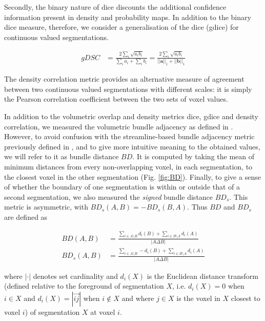Secondly, the binary nature of \gls{dice} discounts the additional confidence information present in density and probability maps.
In addition to the binary \gls{dice} measure, therefore, we consider a generalisation of the \gls{dice} (\gls{gdice}) for continuous valued segmentations.

\begin{align}
  gDSC &= \frac{2 \sum_i \sqrt{a_ib_i} }{\sum_ia_i + \sum_ib_i}
   =  \frac{2 \sum_i \sqrt{a_ib_i} }{||\mathbf{a}||_1 + ||\mathbf{b}||_1}
\end{align}

The density correlation metric provides an alternative measure of agreement between two continuous valued segmentations with different scales:
it is simply the Pearson correlation coefficient between the two sets of voxel values.

In addition to the volumetric overlap and density metrics \gls{dice}, \gls{gdice} and density correlation, we measured the volumetric bundle adjacency as defined in \textcite{Schilling2021a}.
However, to avoid confusion with the streamline-based bundle adjacency\autocite{Radwan2022, Garyfallidis2012, Rheault2022} metric previously defined in \textcite{Garyfallidis2012},
and to give more intuitive meaning to the obtained values, we will refer to it as bundle distance $BD$.
It is computed by taking the mean of minimum distances from every non-overlapping voxel, in each segmentation, to the closest voxel in the other segmentation (Fig. \ref{fig:BD}).
Finally, to give a sense of whether the boundary of one segmentation is within or outside that of a second segmentation, we also measured the \textit{signed} bundle distance $BD_s$.
This metric is asymmetric, with $BD_s (A,B) = -BD_s(B,A)$.
Thus $BD$ and $BD_s$ are defined as

\begin{align}
  BD(A,B) &= \frac{\sum_{i \in A\setminus B} d_i(B) + \sum_{i \in B\setminus A} d_i(A)}{|A\Delta B|} \label{eq:bd} \\
  BD_s(A,B) &= \frac{\sum_{i \in A\setminus B} - d_i(B) + \sum_{i \in B\setminus A} d_i(A)}{|A\Delta B|} \label{eq:bds}
\end{align}

where $| \cdot |$ denotes set cardinality and $d_i(X)$ is the Euclidean distance transform (defined relative to the foreground of segmentation $X$, i.e. $d_i(X) = 0$ when $i \in X $ and $d_i(X) = |\overrightarrow{ij}|$ when $i \not\in X$ and where $j \in X$ is the voxel in $X$ closest to voxel $i$)  of segmentation $X$ at voxel $i$.

